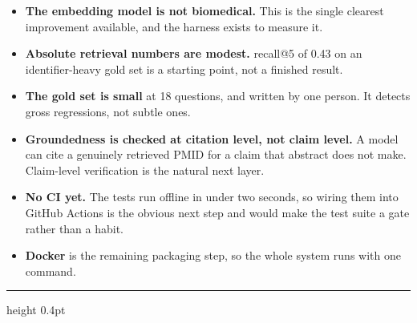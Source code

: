 \documentclass[a4paper,11pt]{article}
\begin{document}
\begin{itemize}
  \item \textbf{The embedding model is not biomedical.} This is the single
        clearest improvement available, and the harness exists to measure it.
  \item \textbf{Absolute retrieval numbers are modest.} recall@5 of 0.43 on an
        identifier-heavy gold set is a starting point, not a finished result.
  \item \textbf{The gold set is small} at 18 questions, and written by one
        person. It detects gross regressions, not subtle ones.
  \item \textbf{Groundedness is checked at citation level, not claim level.} A
        model can cite a genuinely retrieved PMID for a claim that abstract does
        not make. Claim-level verification is the natural next layer.
  \item \textbf{No CI yet.} The tests run offline in under two seconds, so
        wiring them into GitHub Actions is the obvious next step and would make
        the test suite a gate rather than a habit.
  \item \textbf{Docker} is the remaining packaging step, so the whole system
        runs with one command.
\end{itemize}

\vspace{1em}
\hrule height 0.4pt
\vspace{0.8em}
\end{document}

